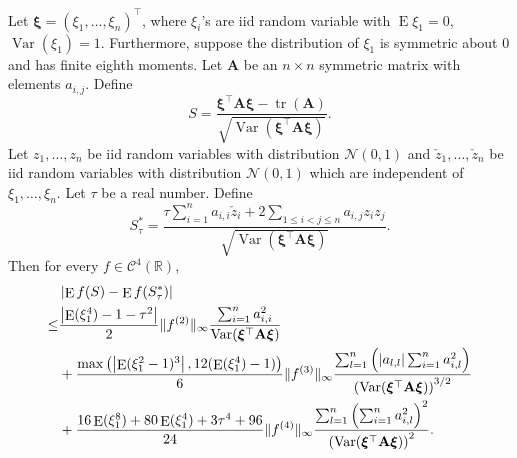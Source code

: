 \documentclass[smallextended]{svjour3}       %
\DeclareMathOperator{\mytr}{tr}
\DeclareMathOperator{\myE}{E}
\DeclareMathOperator{\myVar}{Var}
\newcommand{\BA}{\mathbf{A}}    \newcommand{\BB}{\mathbf{B}}    \newcommand{\BC}{\mathbf{C}}    \newcommand{\BD}{\mathbf{D}}    \newcommand{\BE}{\mathbf{E}}    \newcommand{\BF}{\mathbf{F}}    \newcommand{\BG}{\mathbf{G}}    \newcommand{\BH}{\mathbf{H}}    \newcommand{\BI}{\mathbf{I}}    \newcommand{\BJ}{\mathbf{J}}    \newcommand{\BK}{\mathbf{K}}    \newcommand{\BL}{\mathbf{L}}
\newcommand{\bfsym}[1]{\ensuremath{\boldsymbol{#1}}}
\def\bxi{\bfsym {\xi}}
\begin{document}
\begin{theorem}\label{TheoremLindeberg}

    Let $\bxi=(\xi_1,\ldots,\xi_n)^\top$, where $\xi_i$'s are iid random variable with $\myE \xi_1=0$, $\myVar (\xi_1)=1$.
    Furthermore, suppose the distribution of  $\xi_1$ is symmetric about $0$ and has finite eighth moments.
    Let $\BA$ be an $n\times n$ symmetric matrix with elements $a_{i,j}$.
Define
    \begin{equation*}
        S=\frac{
            \bxi^\top \BA \bxi-\mytr (\BA)
        }{
            \sqrt{
                \myVar(\bxi^\top \BA \bxi)
            }             
        }.
    \end{equation*}
    Let $z_1,\ldots,z_n$  be iid random variables with distribution $\mathcal N (0, 1) $ and $\check z_1, \ldots, \check z_n$ be iid random variables with distribution $\mathcal N (0,1)$ which are independent of $\xi_1,\ldots, \xi_n$.
    Let $\tau$ be a real number.
    Define
    \begin{equation*}
        S_\tau^* =
        \frac{
            \tau \sum_{i=1}^n  a_{i,i}\check z_i
        +2\sum_{1\leq i <j \leq n} a_{i,j} z_i z_j
    }
    {
            \sqrt{
                \myVar(\bxi^\top \BA \bxi)
            }             
        }.
    \end{equation*}
    Then for every $f\in \mathscr C^4(\mathbb R)$,
    \begin{equation}\label{eq:longInequality}
        \begin{split}
             &
              \left| \myE f(S)-\myE f(S_\tau^*)\right|
             \\
\leq&
\frac{
\left|
\myE (\xi_1^4)-1
            -
            \tau^2
\right|
}{2}
\|f^{(2)}\|_\infty
\frac{
    \sum_{i=1}^n a_{i,i}^2
}{
                \myVar(\bxi^\top \BA \bxi)
}
\\
&
            +
            \frac{
            \max\left(
    \left|\myE (\xi_1^2-1)^3\right|
            ,
12 (\myE (\xi_1^4)-1)
        \right)
            }{6} \|f^{(3)}\|_\infty
            \frac{
            \sum_{l=1}^n 
            \left(|a_{l,l}|
         \sum_{i=1}^{n} a_{i,l}^2 
     \right)
 }{
    \left(
                \myVar(\bxi^\top \BA \bxi)
\right)^{3/2}
 }
         \\
            &+
            \frac{
             16 \myE (\xi_1^8) + 80 \myE (\xi_1^4) + 3\tau^4 + 96 
            }{24} \|f^{(4)} \|_{\infty} 
            \frac{
                \sum_{l=1}^n \left( \sum_{i=1}^n a_{i,l}^2 \right)^2
            }{
            \left(
                \myVar(\bxi^\top \BA \bxi)
\right)^{2}
            }
            .
        \end{split}
    \end{equation}
\end{theorem}
\end{document}
